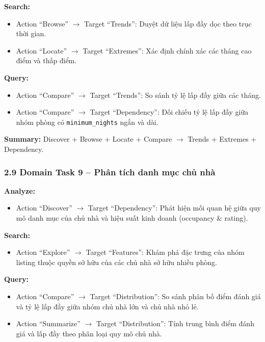 \textbf{Search:} 
\begin{itemize}
    \item Action ``Browse'' $\rightarrow$ Target ``Trends'': Duyệt dữ liệu lấp đầy dọc theo trục thời gian. 
    \item Action ``Locate'' $\rightarrow$ Target ``Extremes'': Xác định chính xác các tháng cao điểm và thấp điểm.
\end{itemize}

\textbf{Query:} 
\begin{itemize}
    \item Action ``Compare'' $\rightarrow$ Target ``Trends'': So sánh tỷ lệ lấp đầy giữa các tháng. 
    \item Action ``Compare'' $\rightarrow$ Target ``Dependency'': Đối chiếu tỷ lệ lấp đầy giữa nhóm phòng có \texttt{minimum\_nights} ngắn và dài.
\end{itemize}

\textbf{Summary:} Discover + Browse + Locate + Compare $\rightarrow$ Trends + Extremes + Dependency.

\subsubsection*{2.9 Domain Task 9 -- Phân tích danh mục chủ nhà}

\textbf{Analyze:} 
\begin{itemize}
    \item Action ``Discover'' $\rightarrow$ Target ``Dependency'': Phát hiện mối quan hệ giữa quy mô danh mục của chủ nhà và hiệu suất kinh doanh (occupancy \& rating).
\end{itemize}

\textbf{Search:} 
\begin{itemize}
    \item Action ``Explore'' $\rightarrow$ Target ``Features'': Khám phá đặc trưng của nhóm listing thuộc quyền sở hữu của các chủ nhà sở hữu nhiều phòng.
\end{itemize}

\textbf{Query:} 
\begin{itemize}
    \item Action ``Compare'' $\rightarrow$ Target ``Distribution'': So sánh phân bố điểm đánh giá và tỷ lệ lấp đầy giữa nhóm chủ nhà lớn và chủ nhà nhỏ lẻ. 
    \item Action ``Summarize'' $\rightarrow$ Target ``Distribution'': Tính trung bình điểm đánh giá và lấp đầy theo phân loại quy mô chủ nhà.
\end{itemize}

